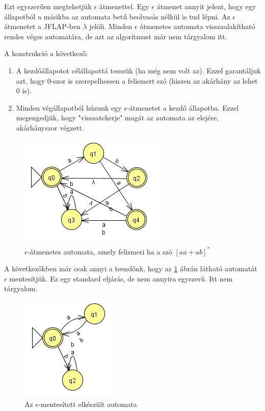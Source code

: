 \documentclass[12pt]{report}
\theoremstyle{definition}
\begin{document}
Ezt egyszerűen megtehetjük $\epsilon$ átmenettel. Egy $\epsilon$ átmenet annyit jelent, hogy egy állapotból a másikba az automata betű beolvasás nélkül is tud lépni. Az $\epsilon$ átmenetet a JFLAP-ben $\lambda$ jelöli. Minden $\epsilon$ átmenetes automata visszaalakítható rendes véges automatára, de azt az algoritmust már nem tárgyalom itt.

A konstrukció a következő:
\begin{enumerate}
\item A kezdőállapotot célállapottá tesszük (ha még nem volt az). Ezzel garantáljuk azt, hogy 0-szor is szerepelhessen a felismert szó (hiszen az akárhány az lehet 0 is).
\item Minden végállapotból húzunk egy $\epsilon$-átmenetet a kezdő állapotba. Ezzel megengedjük, hogy "visszatekerje" magát az automata az elejére, akárhányszor végzett.
\end{enumerate}

\begin{figure}[H]
\centering
\includegraphics[scale=1]{iter_ab_vagy_aa_eps.png}
\caption{\label{it2} $\epsilon$-átmenetes automata, amely felismeri ha a szó $[aa+ab]^*$}
\end{figure}

A következőkben már csak annyi a teendőnk, hogy az \ref{it2} ábrán látható automatát $\epsilon$ mentesítjük. Ez egy standard eljárás, de nem annyira egyszerű. Itt nem tárgyalom.

\begin{figure}[H]
\centering
\includegraphics[scale=1]{iter_ab_vagy_aa_kesz.png}
\caption{\label{it3} Az $\epsilon$-mentesített elkészült automata}
\end{figure}
\end{document}
